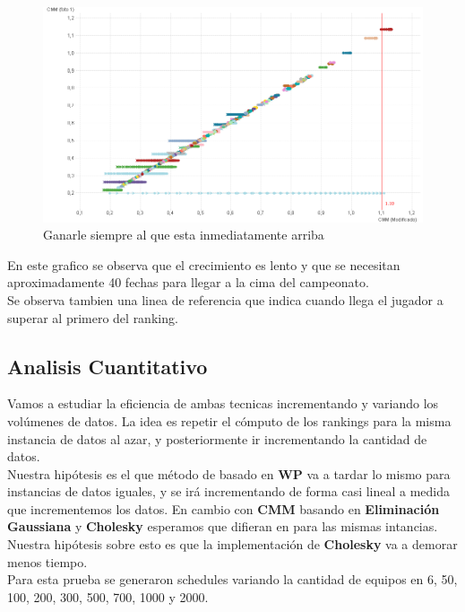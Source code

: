 \begin{figure}[H]
\centering
\includegraphics[width=1\textwidth]{IMG/estrategia 4.png}
\caption{Ganarle siempre al que esta inmediatamente arriba}
\label{fig:Ganarle siempre al que esta inmediatamente arriba}
\end{figure}

En este grafico se observa que el crecimiento es lento y que se necesitan aproximadamente 40 fechas para llegar a la cima del campeonato.\\

Se observa tambien una linea de referencia que indica cuando llega el jugador a superar al primero del ranking.\\


\subsection{Analisis Cuantitativo}


Vamos a estudiar la eficiencia de ambas tecnicas incrementando y variando los volúmenes de datos. La idea es repetir el cómputo de los rankings para la misma instancia de datos al azar, 
y posteriormente ir incrementando la cantidad de datos. \\

Nuestra hipótesis es el que método de basado en \textbf{WP} va a tardar lo mismo para instancias de datos iguales, y se irá incrementando de forma casi lineal a medida que 
incrementemos los datos. En cambio con \textbf{CMM} basando en \textbf{Eliminación Gaussiana} y \textbf{Cholesky} esperamos que difieran en para las mismas intancias. 
Nuestra hipótesis sobre esto es que la implementación de \textbf{Cholesky} va a demorar menos tiempo. \\

Para esta prueba se generaron schedules variando la cantidad de equipos en 6, 50, 100, 200, 300, 500, 700, 1000 y 2000. \\

